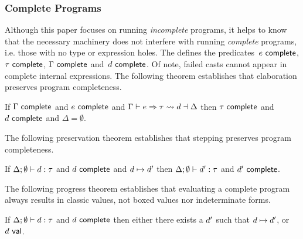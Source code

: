 \subsubsection{Complete Programs}
%
Although this paper focuses on running \emph{incomplete} programs, it helps
to know that the necessary machinery does not interfere with running
\emph{complete} programs, i.e. those with no type or expression holes.
%
The \appendixName{} defines the predicates~$e~\mathsf{complete}$,
$\tau~\mathsf{complete}$, $\Gamma~\mathsf{complete}$ and~$d~\mathsf{complete}$.
%
Of note, failed casts cannot appear in complete internal expressions.
%
The following theorem establishes that elaboration preserves program
completeness.

\begin{thm}
      If $\Gamma~\mathsf{complete}$ and $e~\mathsf{complete}$
      and $\Gamma \vdash e \Rightarrow \tau \leadsto d \dashv \Delta$
      then $\tau~\mathsf{complete}$ and $d~\mathsf{complete}$ and $\Delta = \emptyset$.
\end{thm}

The following preservation theorem establishes that stepping preserves
program completeness.
\begin{thm}
  If $\Delta; \emptyset \vdash d : \tau$
  and $d~\mathsf{complete}$
  and $d \mapsto d'$
  then $\Delta; \emptyset \vdash d' : \tau$
  and $d'~\mathsf{complete}$.
\end{thm}

The following progress theorem establishes that evaluating a complete
program always results in classic values, not boxed values nor
indeterminate forms.
%
\begin{thm}
  If $\Delta; \emptyset \vdash d : \tau$ and $d~\mathsf{complete}$
  then either there exists a $d'$ such that
  $d \mapsto d'$, or $d~\mathsf{val}$.
\end{thm}



